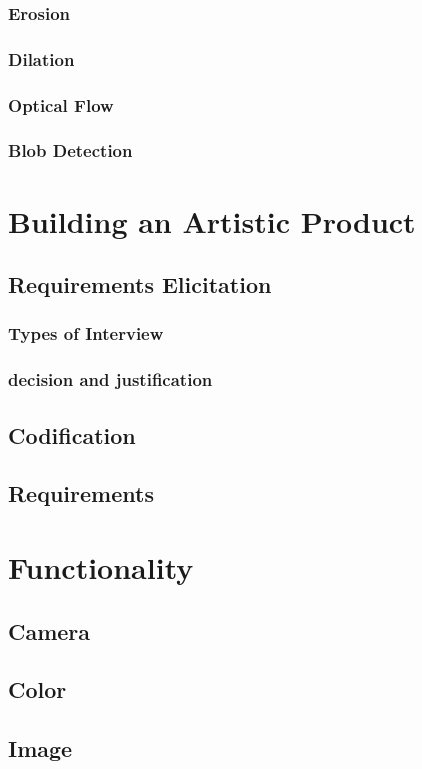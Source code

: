 \documentclass[a4paper]{report}
\begin{document}
\subsubsection{Erosion}
\subsubsection{Dilation}
\subsubsection{Optical Flow}
\subsubsection{Blob Detection}

\section{Building an Artistic Product}
\subsection{Requirements Elicitation}
\subsubsection{Types of Interview}
\subsubsection{decision and justification}
\subsection{Codification}
\subsection{Requirements}

\section{Functionality}
\subsection{Camera}
\subsection{Color}
\subsection{Image}
\end{document}
